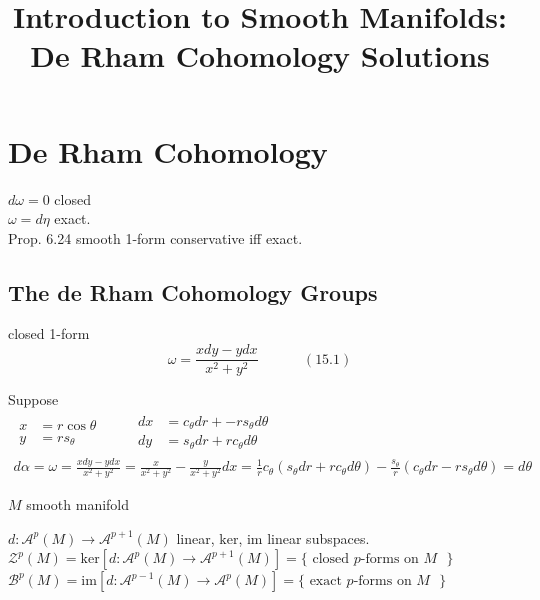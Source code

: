 \documentclass[11pt]{amsart}
\title{Introduction to Smooth Manifolds: De Rham Cohomology Solutions}
\theoremstyle{definition}
\begin{document}
\maketitle
\section{De Rham Cohomology}

$d\omega = 0$ closed \\
$\omega = d\eta$ exact.   \\

Prop. 6.24 smooth 1-form conservative iff exact.

\subsection*{ The de Rham Cohomology Groups}

closed 1-form
\begin{equation}
\omega = \frac{ x dy - y dx}{ x^2 + y^2 }  \quad \quad \quad \, (15.1)
\end{equation}

Suppose
\[
\begin{gathered}
\begin{aligned}
  x & = r\cos{\theta} \\
  y & = r s_{\theta}
\end{aligned} \quad \quad \, \begin{aligned}
  dx & = c_{\theta}dr + -r s_{\theta} d\theta \\
  dy & = s_{\theta} dr + rc_{\theta} d\theta
\end{aligned} \\
d\alpha = \omega = \frac{ x dy - y dx}{ x^2 + y^2 } = \frac{ x}{ x^2 + y^2 } - \frac{y}{x^2 + y^2} dx = \frac{1}{r} c_{\theta} ( s_{\theta} dr + rc_{\theta} d\theta ) - \frac{s_{\theta}}{r} ( c_{\theta} dr - rs_{\theta} d\theta) = d\theta
\end{gathered}
\]

$M$ smooth manifold

$d: \mathcal{A}^p(M) \to \mathcal{A}^{p+1}(M)$ linear, $\text{ker}$, $\text{im}$ linear subspaces.  \\
$\mathcal{Z}^p(M) = \text{ker}{ [ d : \mathcal{A}^p(M) \to \mathcal{A}^{p+1}(M)] } = \lbrace \text{ closed $p$-forms on $M$ } \rbrace$ \\
$\mathcal{B}^p(M) = \text{im}{ [ d: \mathcal{A}^{p-1}(M) \to \mathcal{A}^p(M)]} = \lbrace \text{ exact $p$-forms on $M$ } \rbrace$
\end{document}
